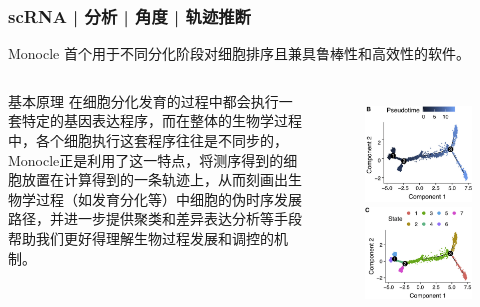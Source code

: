 \documentclass[11pt]{ctexbeamer}
\begin{document}
\begin{frame}
	\frametitle{scRNA | 分析 | 角度 | 轨迹推断}
	\begin{block}{Monocle}
		首个用于不同分化阶段对细胞排序且兼具鲁棒性和高效性的软件。
	\end{block}
     \begin{columns}
    	\begin{block}{基本原理}
    		在细胞分化发育的过程中都会执行一套特定的基因表达程序，而在整体的生物学过程中，各个细胞执行这套程序往往是不同步的，Monocle正是利用了这一特点，将测序得到的细胞放置在计算得到的一条轨迹上，从而刻画出生物学过程（如发育分化等）中细胞的伪时序发展路径，并进一步提供聚类和差异表达分析等手段帮助我们更好得理解生物过程发展和调控的机制。
    	\end{block}
    	\begin{figure}
    		\includegraphics[width=\textwidth]{scRNA_monocle_01.png}
    		\includegraphics[width=\textwidth]{scRNA_monocle_02.png}

\end{figure}
\end{columns}
\end{frame}
\end{document}
